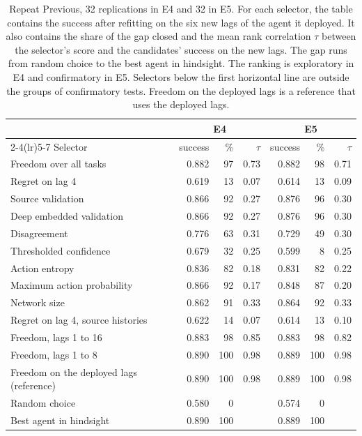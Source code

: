 \begin{table}[t]
\centering
\caption{Repeat Previous, 32 replications in E4 and 32 in E5. For each selector, the table contains the success after refitting on the six new lags of the agent it deployed. It also contains the share of the gap closed and the mean rank correlation $\tau$ between the selector's score and the candidates' success on the new lags. The gap runs from random choice to the best agent in hindsight. The ranking is exploratory in E4 and confirmatory in E5. Selectors below the first horizontal line are outside the groups of confirmatory tests. Freedom on the deployed lags is a reference that uses the deployed lags.}
\label{tab:rp}
\small
\begin{tabular}{@{}lrrrrrr@{}}
\toprule
 & \multicolumn{3}{c}{E4} & \multicolumn{3}{c}{E5} \\
\cmidrule(lr){2-4}\cmidrule(lr){5-7}
Selector & success & \% & $\tau$ & success & \% & $\tau$ \\
\midrule
Freedom over all tasks & 0.882 & 97 & 0.73 & 0.882 & 98 & 0.71 \\
Regret on lag 4 & 0.619 & 13 & 0.07 & 0.614 & 13 & 0.09 \\
Source validation & 0.866 & 92 & 0.27 & 0.876 & 96 & 0.30 \\
Deep embedded validation & 0.866 & 92 & 0.27 & 0.876 & 96 & 0.30 \\
Disagreement & 0.776 & 63 & 0.31 & 0.729 & 49 & 0.30 \\
Thresholded confidence & 0.679 & 32 & 0.25 & 0.599 & 8 & 0.25 \\
Action entropy & 0.836 & 82 & 0.18 & 0.831 & 82 & 0.22 \\
Maximum action probability & 0.866 & 92 & 0.17 & 0.848 & 87 & 0.20 \\
Network size & 0.862 & 91 & 0.33 & 0.864 & 92 & 0.33 \\
\midrule
Regret on lag 4, source histories & 0.622 & 14 & 0.07 & 0.614 & 13 & 0.10 \\
Freedom, lags 1 to 16 & 0.883 & 98 & 0.85 & 0.883 & 98 & 0.82 \\
Freedom, lags 1 to 8 & 0.890 & 100 & 0.98 & 0.889 & 100 & 0.98 \\
Freedom on the deployed lags (reference) & 0.890 & 100 & 0.98 & 0.889 & 100 & 0.98 \\
\midrule
Random choice & 0.580 & 0 & & 0.574 & 0 & \\
Best agent in hindsight & 0.890 & 100 & & 0.889 & 100 & \\
\bottomrule
\end{tabular}
\end{table}
